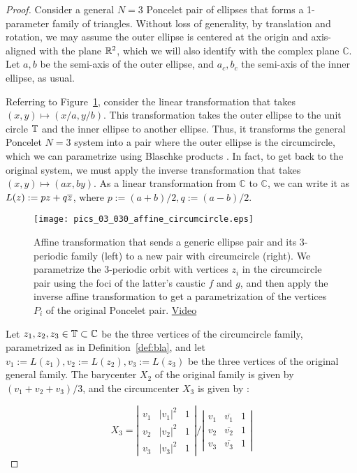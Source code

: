 \begin{proof}
Consider a general $N=3$ Poncelet pair of ellipses that forms a 1-parameter family of triangles. Without loss of generality, by translation and rotation, we may assume the outer ellipse is centered at the origin and axis-aligned with the plane $\mathbb{R}^2$, which we will also identify with the complex plane $\mathbb{C}$. Let $a,b$ be the semi-axis of the outer ellipse, and $a_c,b_c$ the semi-axis of the inner ellipse, as usual. 

Referring to Figure~\ref{fig:affine}, consider the linear transformation that takes $(x,y)\mapsto(x/a,y/b)$. This transformation takes the outer ellipse to the unit circle $\mathbb{T}$ and the inner ellipse to another ellipse. Thus, it transforms the general Poncelet $N=3$ system into a pair where the outer ellipse is the circumcircle, which we can parametrize using Blaschke products \cite{daepp-2019}. In fact, to get back to the original system, we must apply the inverse transformation that takes $(x,y)\mapsto(a x,b y)$. As a linear transformation from $\mathbb{C}$ to $\mathbb{C}$, we can write it as $L(z):=p z+q \overline{z}$, where $p:=(a+b)/2, q:=(a-b)/2$.

\begin{figure}
    \centering
    \texttt{[image: pics\_03\_030\_affine\_circumcircle.eps]}
    \caption{Affine transformation that sends a generic ellipse pair and its 3-periodic family (left) to a new pair with circumcircle (right). We parametrize the 3-periodic orbit with vertices $z_i$ in the circumcircle pair using the foci of the latter's caustic $f$ and $g$, and then apply the inverse affine transformation to get a parametrization of the vertices $P_i$ of the original Poncelet pair. \href{https://youtu.be/6xSFBLWIkTM}{Video}}
    \label{fig:affine}
\end{figure}


Let $z_1,z_2,z_3\in\mathbb{T}\subset\mathbb{C}$ be the three vertices of the circumcircle family, parametrized as in Definition~\ref{def:bla}, and let $v_1:=L(z_1),v_2:=L(z_2),v_3:=L(z_3)$ be the three vertices of the original general family. The barycenter $X_2$ of the original family is given by $(v_1+v_2+v_3)/3$, and the circumcenter $X_3$ is given by \cite{stackexchange-x3a}:

\[
    X_3=\left|
        \begin{array}{ccc}
          v_1 & |v_1|^2 & 1 \\
          v_2 & |v_2|^2 & 1 \\
          v_3 & |v_3|^2 & 1
        \end{array}
      \right| \Bigg/
     \left|
        \begin{array}{ccc}
          v_1 & \overline{v_1} & 1 \\
          v_2 & \overline{v_2} & 1 \\
          v_3 & \overline{v_3} & 1
        \end{array}
      \right|
\]


\end{proof}
